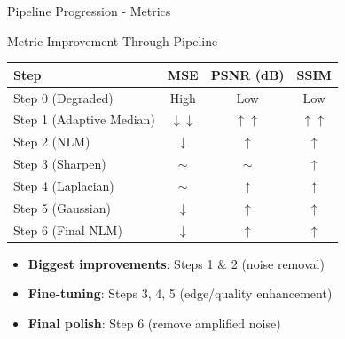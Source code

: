 \documentclass[aspectratio=169]{beamer}
\begin{document}
\begin{frame}{Pipeline Progression - Metrics}
    \begin{block}{Metric Improvement Through Pipeline}
        \begin{table}
            \centering
            \small
            \begin{tabular}{lccc}
                \toprule
                \textbf{Step} & \textbf{MSE} & \textbf{PSNR (dB)} & \textbf{SSIM} \\
                \midrule
                Step 0 (Degraded) & High & Low & Low \\
                Step 1 (Adaptive Median) & $\downarrow\downarrow$ & $\uparrow\uparrow$ & $\uparrow\uparrow$ \\
                Step 2 (NLM) & $\downarrow$ & $\uparrow$ & $\uparrow$ \\
                Step 3 (Sharpen) & $\sim$ & $\sim$ & $\uparrow$ \\
                Step 4 (Laplacian) & $\sim$ & $\uparrow$ & $\uparrow$ \\
                Step 5 (Gaussian) & $\downarrow$ & $\uparrow$ & $\uparrow$ \\
                Step 6 (Final NLM) & $\downarrow$ & $\uparrow$ & $\uparrow$ \\
                \bottomrule
            \end{tabular}
        \end{table}
    \end{block}
    
    \begin{itemize}
        \item \textbf{Biggest improvements}: Steps 1 \& 2 (noise removal)
        \item \textbf{Fine-tuning}: Steps 3, 4, 5 (edge/quality enhancement)
        \item \textbf{Final polish}: Step 6 (remove amplified noise)
    \end{itemize}
\end{frame}
\end{document}
